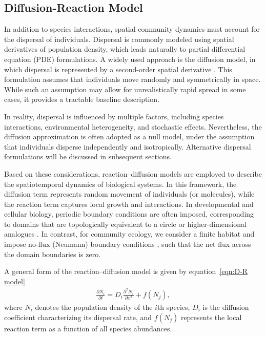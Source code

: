 \subsection{Diffusion-Reaction Model}

    In addition to species interactions, spatial community dynamics must account for the dispersal of individuals. Dispersal is commonly modeled using spatial derivatives of population density, which leads naturally to partial differential equation (PDE) formulations. A widely used approach is the diffusion model, in which dispersal is represented by a second-order spatial derivative \citep{kallen_simple_1985}. This formulation assumes that individuals move randomly and symmetrically in space. While such an assumption may allow for unrealistically rapid spread in some cases, it provides a tractable baseline description.

    In reality, dispersal is influenced by multiple factors, including species interactions, environmental heterogeneity, and stochastic effects. Nevertheless, the diffusion approximation is often adopted as a null model, under the assumption that individuals disperse independently and isotropically. Alternative dispersal formulations will be discussed in subsequent sections.

    Based on these considerations, reaction--diffusion models are employed to describe the spatiotemporal dynamics of biological systems. In this framework, the diffusion term represents random movement of individuals (or molecules), while the reaction term captures local growth and interactions. In developmental and cellular biology, periodic boundary conditions are often imposed, corresponding to domains that are topologically equivalent to a circle or higher-dimensional analogues \citep{turing_chemical_1990}. In contrast, for community ecology, we consider a finite habitat and impose no-flux (Neumann) boundary conditions \citep{kondo_reaction-diffusion_2010,simpson_fisherkpp-type_2024}, such that the net flux across the domain boundaries is zero.

    A general form of the reaction--diffusion model is given by equation~\ref{eqn:D-R model}
    \begin{equation}\label{eqn:D-R model}
        \begin{aligned}
            \frac{\partial N_i}{\partial t}
            = D_{i}\frac{\partial^2 N_i}{\partial x^2}
            + f(N_j),
        \end{aligned}
    \end{equation}
    where $N_i$ denotes the population density of the $i$th species, $D_i$ is the diffusion coefficient characterizing its dispersal rate, and $f(N_j)$ represents the local reaction term as a function of all species abundances.

